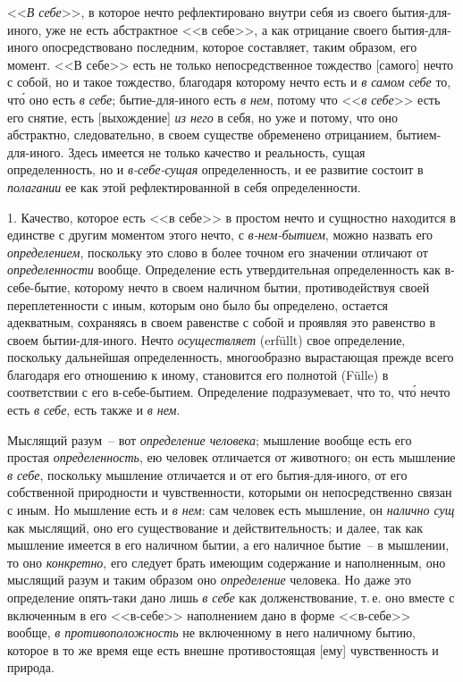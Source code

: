 <<\emph{В себе}>>, в которое нечто рефлектировано внутри себя
из своего бытия-для-иного, уже не есть абстрактное
<<в себе>>, а как отрицание своего бытия-для-иного опосредствовано
последним, которое составляет, таким образом,
его момент. <<В себе>> есть не только непосредственное
тождество [самого] нечто с собой, но и такое тождество,
благодаря которому нечто есть и \emph{в самом себе} то,
чт\'о оно есть \emph{в себе}; бытие-для-иного есть \emph{в нем}, потому
что <<\emph{в себе}>> есть его снятие, есть [выхождение] \emph{из него}
в себя, но уже и потому, что оно абстрактно, следовательно,
в своем существе обременено отрицанием, бытием-для-иного.
Здесь имеется не только качество и реальность,
сущая определенность, но и \emph{в-себе-сущая} определенность,
и ее развитие состоит в \emph{полагании} ее как этой
рефлектированной в себя определенности.

1. Качество, которое есть <<в себе>> в простом нечто
и сущностно находится в единстве с другим моментом
этого нечто, с \emph{в-нем-бытием}, можно назвать его \emph{определением},
поскольку это слово в более точном его значении
отличают от \emph{определенности} вообще. Определение есть
утвердительная определенность как в-себе-бытие, которому
нечто в своем наличном бытии, противодействуя своей
переплетенности с иным, которым оно было бы определено,
остается адекватным, сохраняясь в своем равенстве
с собой и проявляя это равенство в своем бытии-для-иного.
Нечто \emph{осуществляет} (erfüllt) свое определение\endnotemark{}, поскольку
дальнейшая определенность, многообразно вырастающая
прежде всего благодаря его отношению к иному,
становится его полнотой (Fülle) в соответствии с его
в-себе-бытием. Определение подразумевает, что то, чт\'о
нечто есть \emph{в себе}, есть также и \emph{в нем}.


Мыслящий разум~-- вот \emph{определение человека}; мышление
вообще есть его простая \emph{определенность}, ею человек
отличается от животного; он есть мышление \emph{в себе},
поскольку мышление отличается и от его бытия-для-иного,
от его собственной природности и чувственности,
которыми он непосредственно связан с иным. Но мышление
есть и \emph{в нем}: сам человек есть мышление, он \emph{налично
сущ} как мыслящий, оно его существование и действительность;
и далее, так как мышление имеется в его наличном
бытии, а его наличное бытие~-- в мышлении, то
оно \emph{конкретно}, его следует брать имеющим содержание
и наполненным, оно мыслящий разум и таким образом
оно \emph{определение} человека. Но даже это определение
опять-таки дано лишь \emph{в себе} как долженствование, т.\,е.
оно вместе с включенным в его <<в-себе>> наполнением
дано в форме <<в-себе>> вообще, \emph{в противоположность} не
включенному в него наличному бытию, которое в то же
время еще есть внешне противостоящая [ему] чувственность
и природа.

